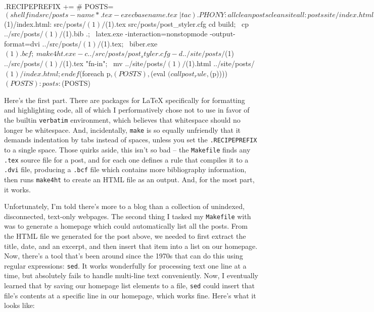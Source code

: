 \documentclass[11pt]{article}
\begin{document}
\begin{verbatim*}
.RECIPEPREFIX += #
POSTS=$(shell find src/posts -name *.tex -exec basename {} .tex \; | tac)

.PHONY: all clean posts cleansite

all: posts site/index.html

define post_rule
site/posts/$(1)/index.html: src/posts/$(1)/$(1).tex src/posts/post_styler.cfg
    cd build; \
    cp ../src/posts/$(1)/$(1).bib .; \
    latex.exe -interaction=nonstopmode -output-format=dvi ../src/posts/$(1)/$(1).tex; \
    biber.exe $(1).bcf; \
    make4ht.exe -c ../src/posts/post_styler.cfg -d ../site/posts/$(1) ../src/posts/$(1)/$(1).tex "fn-in"; \
    mv ../site/posts/$(1)/$(1).html ../site/posts/$(1)/index.html;
endef

$(foreach p,$(POSTS),$(eval $(call post_rule,$(p))))
$(POSTS): %: site/posts/%/index.html
posts: $(POSTS)        
\end{verbatim*}

    Here's the first part. There are packages for LaTeX specifically for formatting and highlighting code, all of which I performatively chose not to use in favor of the builtin \texttt{verbatim} environment, which believes that whitespace should no longer be whitespace. And, incidentally, \texttt{make} is so equally unfriendly that it demands indentation by tabs instead of spaces, unless you set the \texttt{.RECIPEPREFIX} to a single space. Those quirks aside, this isn't so bad -- the \texttt{Makefile} finds any \texttt{.tex} source file for a post, and for each one defines a rule that compiles it to a \texttt{.dvi} file, producing a \texttt{.bcf} file which contains more bibliography information, then runs \texttt{make4ht} to create an HTML file as an output. And, for the most part, it works. 

    Unfortunately, I'm told there's more to a blog than a collection of unindexed, disconnected, text-only webpages. The second thing I tasked my \texttt{Makefile} with was to generate a homepage which could automatically list all the posts. From the HTML file we generated for the post above, we needed to first extract the title, date, and an excerpt, and then insert that item into a list on our homepage. Now, there's a tool that's been around since the 1970s that can do this using regular expressions: \texttt{sed}. It works wonderfully for processing text one line at a time, but absolutely fails to handle multi-line text conveniently. Now, I eventually learned that by saving our homepage list elements to a file, \texttt{sed} could insert that file's contents at a specific line in our homepage, which works fine. Here's what it looks like: 
    
\end{document}

